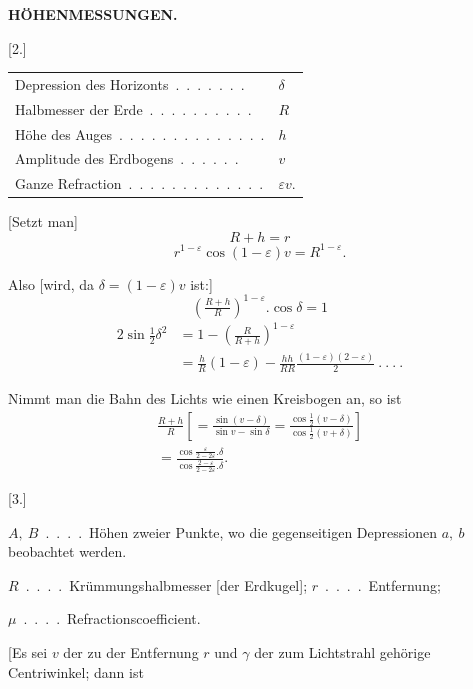 \par\clearpage
\noindent\null\hfill{\small\textbf{HÖHENMESSUNGEN.}}\hfill{}\par\medskip
\begingroup
\setlength{\abovedisplayskip}{5pt}\setlength{\belowdisplayskip}{5pt}
\begin{center}
[2.]\par\medskip
\begin{tabular}{l@{\ }l}
Depression des Horizonts\ .\ .\ .\ .\ .\ .\ .&\(\delta\)\\
Halbmesser der Erde\ .\ .\ .\ .\ .\ .\ .\ .\ .\ .&\(R\)\\
Höhe des Auges\ .\ .\ .\ .\ .\ .\ .\ .\ .\ .\ .\ .\ .\ .&\(h\)\\
Amplitude des Erdbogens\ .\ .\ .\ .\ .\ .&\(v\)\\
Ganze Refraction\ .\ .\ .\ .\ .\ .\ .\ .\ .\ .\ .\ .\ .&\(\varepsilon v\).
\end{tabular}
\end{center}
\par\noindent\hspace*{\parindent}[Setzt man]
\[R+h=r\]
\noindent [so ist:]
\[r^{1-\varepsilon}\cos(1-\varepsilon)v=R^{1-\varepsilon}.\]
\par\noindent\hspace*{\parindent}Also [wird, da \(\delta=(1-\varepsilon)v\) ist:]
\[\left(\tfrac{R+h}{R}\right)^{1-\varepsilon}.\cos\delta=1\]
\noindent [oder]
\[\begin{aligned}
2\sin\tfrac12\delta^2&=1-\left(\tfrac{R}{R+h}\right)^{1-\varepsilon}\\
&=\tfrac{h}{R}(1-\varepsilon)-\tfrac{hh}{RR}\tfrac{(1-\varepsilon)(2-\varepsilon)}{2}\ .\ .\ .\ .
\end{aligned}\]
\par\noindent\hspace*{\parindent}Nimmt man die Bahn des Lichts wie einen Kreisbogen an, so ist
\[\begin{aligned}
\tfrac{R+h}{R}\left[=\tfrac{\sin(v-\delta)}{\sin v-\sin\delta}=\tfrac{\cos\frac12(v-\delta)}{\cos\frac12(v+\delta)}\right]\\
=\frac{\cos\tfrac{\varepsilon}{2-2\varepsilon}.\delta}{\cos\tfrac{2-\varepsilon}{2-2\varepsilon}.\delta}.
\end{aligned}\]
\begin{center}[3.]\end{center}
\par\noindent\hspace*{\parindent}\(A,\ B\)\ .\ .\ .\ .\ Höhen zweier Punkte, wo die gegenseitigen Depressionen
\(a,\ b\) beobachtet werden.
\par\noindent\hspace*{\parindent}\(R\)\ .\ .\ .\ .\ Krümmungshalbmesser [der Erdkugel]; \(r\)\ .\ .\ .\ .\ Entfernung;
\begin{center}\(\mu\)\ .\ .\ .\ .\ Refractionscoefficient.\end{center}
\par\noindent\hspace*{\parindent}[Es sei \(v\) der zu der Entfernung \(r\) und \(\gamma\) der zum Lichtstrahl gehörige
Centriwinkel; dann ist
\endgroup
